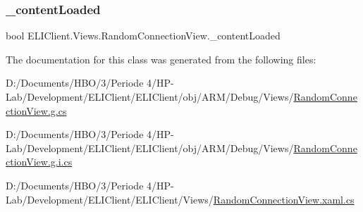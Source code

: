 \subsubsection{\texorpdfstring{\+\_\+content\+Loaded}{\_contentLoaded}}
{\footnotesize\ttfamily bool E\+L\+I\+Client.\+Views.\+Random\+Connection\+View.\+\_\+content\+Loaded\hspace{0.3cm}{\ttfamily [private]}}



The documentation for this class was generated from the following files\+:\begin{DoxyCompactItemize}
\item 
D\+:/\+Documents/\+H\+B\+O/3/\+Periode 4/\+H\+P-\/\+Lab/\+Development/\+E\+L\+I\+Client/\+E\+L\+I\+Client/obj/\+A\+R\+M/\+Debug/\+Views/\hyperlink{_a_r_m_2_debug_2_views_2_random_connection_view_8g_8cs}{Random\+Connection\+View.\+g.\+cs}\item 
D\+:/\+Documents/\+H\+B\+O/3/\+Periode 4/\+H\+P-\/\+Lab/\+Development/\+E\+L\+I\+Client/\+E\+L\+I\+Client/obj/\+A\+R\+M/\+Debug/\+Views/\hyperlink{_a_r_m_2_debug_2_views_2_random_connection_view_8g_8i_8cs}{Random\+Connection\+View.\+g.\+i.\+cs}\item 
D\+:/\+Documents/\+H\+B\+O/3/\+Periode 4/\+H\+P-\/\+Lab/\+Development/\+E\+L\+I\+Client/\+E\+L\+I\+Client/\+Views/\hyperlink{_random_connection_view_8xaml_8cs}{Random\+Connection\+View.\+xaml.\+cs}\end{DoxyCompactItemize}
